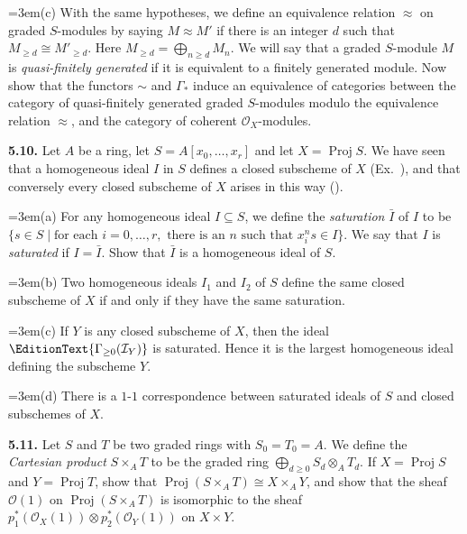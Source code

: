 {\noindent\hangindent=3em\hspace*{1.7em}(c) With the same hypotheses, we define an equivalence relation $\approx$ on graded $S$-modules by saying $M\approx M'$ if there is an integer $d$ such that $M_{\ge d}\cong M'_{\ge d}$. Here $M_{\ge d}=\bigoplus_{n\ge d} M_n$. We will say that a graded $S$-module $M$ is \emph{quasi-finitely generated} if it is equivalent to a finitely generated module. Now show that the functors $\sim$ and $\Gamma_*$ induce an equivalence of categories between the category of quasi-finitely generated graded $S$-modules modulo the equivalence relation $\approx$, and the category of coherent $\mathcal O_X$-modules.

\smallskip
\noindent\hypertarget{ex-II-5.10}{}\textbf{5.10.} Let $A$ be a ring, let $S=A[x_0,\ldots,x_r]$ and let $X=\operatorname{Proj} S$. We have seen that a homogeneous ideal $I$ in $S$ defines a closed subscheme of $X$ (Ex.~), and that conversely every closed subscheme of $X$ arises in this way ().

\noindent\hangindent=3em\hspace*{1.7em}(a) For any homogeneous ideal $I\subseteq S$, we define the \emph{saturation} $\bar I$ of $I$ to be $\{s\in S\mid\text{for each }i=0,\ldots,r,\text{ there is an }n\text{ such that }x_i^ns\in I\}$. We say that $I$ is \emph{saturated} if $I=\bar I$. Show that $\bar I$ is a homogeneous ideal of $S$.

\noindent\hangindent=3em\hspace*{1.7em}(b) Two homogeneous ideals $I_1$ and $I_2$ of $S$ define the same closed subscheme of $X$ if and only if they have the same saturation.

\noindent\hangindent=3em\hspace*{1.7em}(c) If $Y$ is any closed subscheme of $X$, then the ideal $\EditionText{\Gamma_{\geq0}(\mathcal I_Y)}$ is saturated. Hence it is the largest homogeneous ideal defining the subscheme $Y$.

\noindent\hangindent=3em\hspace*{1.7em}(d) There is a $1$-$1$ correspondence between saturated ideals of $S$ and closed subschemes of $X$.

\smallskip
\noindent\hypertarget{ex-II-5.11}{}\textbf{5.11.} Let $S$ and $T$ be two graded rings with $S_0=T_0=A$. We define the \emph{Cartesian product} $S\times_A T$ to be the graded ring $\bigoplus_{d\ge 0}S_d\otimes_A T_d$. If $X=\operatorname{Proj} S$ and $Y=\operatorname{Proj} T$, show that $\operatorname{Proj}(S\times_A T)\cong X\times_A Y$, and show that the sheaf $\mathcal O(1)$ on $\operatorname{Proj}(S\times_A T)$ is isomorphic to the sheaf $p_1^*(\mathcal O_X(1))\otimes p_2^*(\mathcal O_Y(1))$ on $X\times Y$.

}
